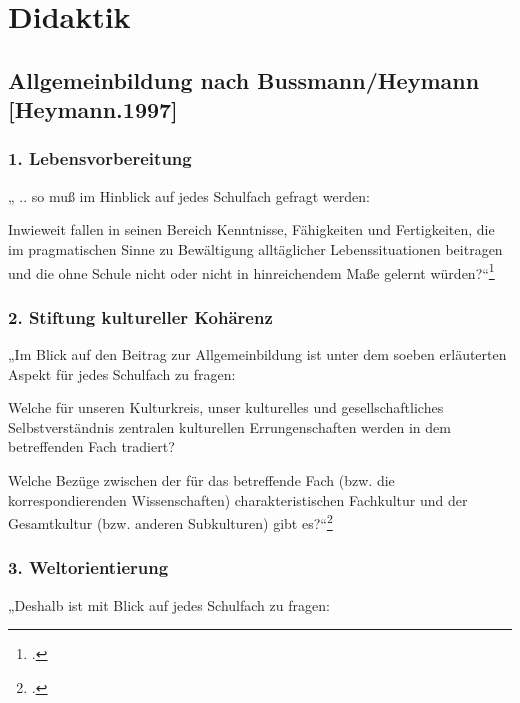 \documentclass{lehramt-informatik-haupt}
\begin{document}

\chapter{Didaktik}

\section{Allgemeinbildung nach Bussmann/Heymann [Heymann.1997]}

%

\subsection{1. Lebensvorbereitung}

„ .. so muß im Hinblick auf jedes Schulfach gefragt werden:

Inwieweit fallen in seinen Bereich Kenntnisse, Fähigkeiten und
Fertigkeiten, die im pragmatischen Sinne zu Bewältigung alltäglicher
Lebenssituationen beitragen und die ohne Schule nicht oder nicht in
hinreichendem Maße gelernt würden?“\footcite[Seite 5]{ddi:fs:1}

%

\subsection{2. Stiftung kultureller Kohärenz}

„Im Blick auf den Beitrag zur Allgemeinbildung ist unter dem soeben
erläuterten Aspekt für jedes Schulfach zu fragen:

Welche für unseren Kulturkreis, unser kulturelles und gesellschaftliches
Selbstverständnis zentralen kulturellen Errungenschaften werden in dem
betreffenden Fach tradiert?

Welche Bezüge zwischen der für das betreffende Fach (bzw. die
korrespondierenden Wissenschaften) charakteristischen Fachkultur und der
Gesamtkultur (bzw. anderen Subkulturen) gibt es?“\footcite[Seite 6]{ddi:fs:1}

%

\subsection{3. Weltorientierung}

„Deshalb ist mit Blick auf jedes Schulfach zu fragen:
\end{document}
